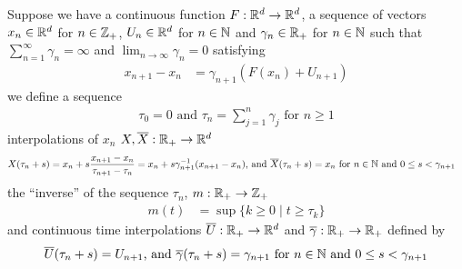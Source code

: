 \begin{defn}Suppose we have a continuous function $F : \mathbb{R}^d \to \mathbb{R}^d$, a sequence of vectors $x_n \in \mathbb{R}^d$ for $n \in \mathbb{Z}_+$, $U_n \in \mathbb{R}^d$ for $n \in \mathbb{N}$ and $\gamma_n \in \mathbb{R}_+$ for $n \in \mathbb{N}$ such that $\sum_{n=1}^\infty \gamma_n = \infty$ and $\lim_{n \to \infty} \gamma_n = 0$ satisfying
\begin{align*}
x_{n+1} - x_n &= \gamma_{n+1} ( F(x_n) + U_{n+1})
\end{align*}
we define a sequence 
\begin{align*}
\tau_0 = 0 \text{ and } \tau_n = \sum_{j=1}^n \gamma_j \text{ for $n \geq 1$}
\end{align*}
interpolations of $x_n$ $X, \overline{X} : \mathbb{R}_+ \to \mathbb{R}^d$
\begin{align*}
X(\tau_n + s) &= x_n + s\frac{x_{n+1} - x_n}{\tau_{n+1} - \tau_n} = x_n + s \gamma_{n+1}^{-1} (x_{n+1} - x_n) \text{, and } \overline{X}(\tau_n + s) = x_n \text{ for $n \in \mathbb{N}$ and $0 \leq s < \gamma_{n+1}$}
\end{align*}
the ``inverse'' of the sequence $\tau_n$, $m : \mathbb{R}_+ \to \mathbb{Z}_+$
\begin{align*}
m(t) &= \sup \lbrace k \geq 0 \mid t \geq \tau_k \rbrace
\end{align*}
and continuous time interpolations $\overline{U} : \mathbb{R}_+ \to \mathbb{R}^d$ and $\overline{\gamma}: \mathbb{R}_+ \to \mathbb{R}_+$ defined by
\begin{align*}
\overline{U}(\tau_n + s) = U_{n+1} \text{, and } \overline{\gamma}(\tau_n +s) = \gamma_{n+1}  \text{ for $n \in \mathbb{N}$ and $0 \leq s < \gamma_{n+1}$}
\end{align*}
\end{defn} 

